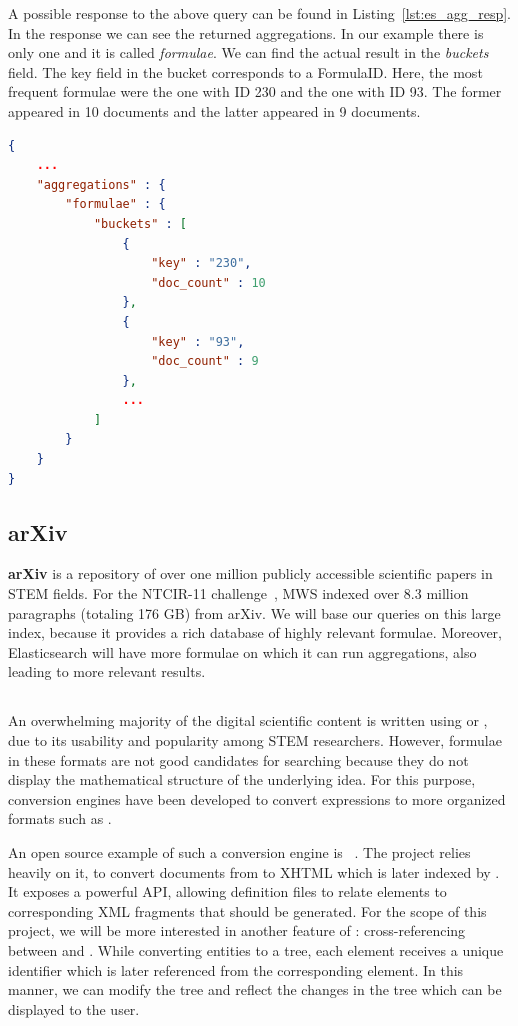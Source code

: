 A possible response to the above query can be found in
Listing~\ref{lst:es_agg_resp}. In the response we can see the returned
aggregations. In our example there is only one and it is called
\emph{formulae}. We can find the actual result in the \emph{buckets} field. The
\textsf{key} field in the bucket corresponds to a \textsf{FormulaID}.
Here, the most frequent formulae were the one with ID 230 and the one with ID
93. The former appeared in 10 documents and the latter appeared in 9 documents.

\begin{lstlisting}[language=json,firstnumber=1,caption=Elastic Search Term
Aggregation Response, captionpos=b, label=lst:es_agg_resp]
{
    ...
    "aggregations" : {
        "formulae" : {
            "buckets" : [
                {
                    "key" : "230",
                    "doc_count" : 10
                },
                {
                    "key" : "93",
                    "doc_count" : 9
                },
                ...
            ]
        }
    }
}
\end{lstlisting}

\subsection{arXiv}\label{subsec:arxiv}
\textbf{arXiv} is a repository of over one million publicly accessible
scientific papers in STEM fields. For the NTCIR-11
challenge~\cite{HamKohPro:man14},
MWS indexed over 8.3 million paragraphs (totaling 176 GB) from arXiv. We will
base our queries on this large index, because it provides a rich database of
highly relevant formulae. Moreover, Elasticsearch will have more formulae on
which it can run aggregations, also leading to more relevant results.

\subsection{\latexml}\label{subsec:latexml}
An overwhelming majority of the digital scientific content is written using
\latex or \tex, due to its usability and popularity among STEM researchers.
However, formulae in these formats are not good candidates for searching
because they do not display the mathematical structure of the underlying
idea. For this purpose, conversion engines have been developed to convert
\latex expressions to more organized formats such as \mathml.

An open source example of such a conversion engine is
\latexml~\cite{Miller:latexml:online}. The \mws project relies heavily on it,
to convert \arxiv documents from \latex to XHTML which is later indexed by \MWS.
It exposes a powerful API, allowing definition files to relate \tex elements to
corresponding XML fragments that should be generated.
For the scope of this project, we will be more interested in another feature of
\latexml: cross-referencing between \pmml and \cmml. While converting \tex
entities to a \pmml tree, each element receives a unique identifier which is
later referenced from the corresponding \cmml element. In this manner, we can
modify the \cmml tree and reflect the changes in the \pmml tree which can be
displayed to the user.

